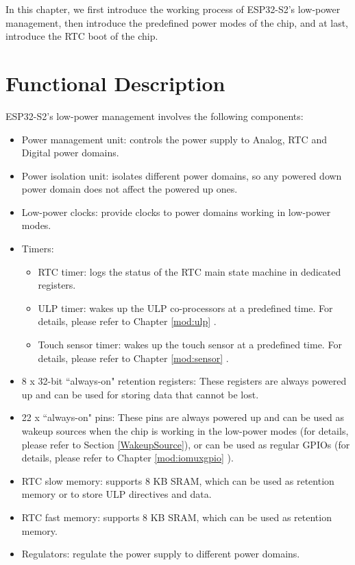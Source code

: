 \documentclass[main\_\_EN.tex]{subfiles}
\begin{document}
In this chapter, we first introduce the working process of ESP32-S2's low-power management, then introduce the predefined power modes of the chip, and at last, introduce the RTC boot of the chip.

\section{Functional Description}

ESP32-S2's low-power management involves the following components:

\begin{itemize}
    \item Power management unit: controls the power supply to Analog, RTC and Digital power domains.
    \item Power isolation unit: isolates different power domains, so any powered down power domain does not affect the powered up ones.
    \item Low-power clocks: provide clocks to power domains working in low-power modes.
    \item Timers:
    \begin{itemize}
        \item RTC timer: logs the status of the RTC main state machine in dedicated registers.
        \item ULP timer: wakes up the ULP co-processors at a predefined time. For details, please refer to Chapter \ref{mod:ulp} \textit{}.
        \item Touch sensor timer: wakes up the touch sensor at a predefined time. For details, please refer to Chapter \ref{mod:sensor} \textit{}.
    \end{itemize}
    \item 8 x 32-bit ``always-on" retention registers: These registers are always powered up and can be used for storing data that cannot be lost.
    \item 22 x ``always-on" pins: These pins are always powered up and can be used as wakeup sources when the chip is working in the low-power modes (for details, please refer to Section \ref{WakeupSource}), or can be used as regular GPIOs (for details, please refer to Chapter \ref{mod:iomuxgpio} \textit{}).
    \item RTC slow memory: supports 8 KB SRAM, which can be used as retention memory or to store ULP directives and data.
    \item RTC fast memory: supports 8 KB SRAM, which can be used as retention memory.
    \item Regulators: regulate the power supply to different power domains.
\end{itemize}
\end{document}
